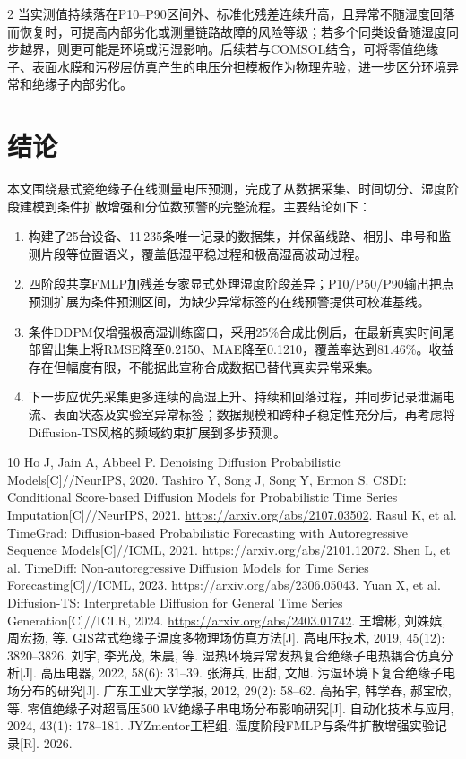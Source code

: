 \documentclass[UTF8,a4paper,10pt]{ctexart}
\begin{document}
\begin{multicols}{2}
当实测值持续落在P10--P90区间外、标准化残差连续升高，且异常不随湿度回落而恢复时，可提高内部劣化或测量链路故障的风险等级；若多个同类设备随湿度同步越界，则更可能是环境或污湿影响。后续若与COMSOL结合，可将零值绝缘子、表面水膜和污秽层仿真产生的电压分担模板作为物理先验，进一步区分环境异常和绝缘子内部劣化。

\section{结论}
本文围绕悬式瓷绝缘子在线测量电压预测，完成了从数据采集、时间切分、湿度阶段建模到条件扩散增强和分位数预警的完整流程。主要结论如下：
\begin{enumerate}[leftmargin=1.4em,itemsep=0.1em]
\item 构建了25台设备、11\,235条唯一记录的数据集，并保留线路、相别、串号和监测片段等位置语义，覆盖低湿平稳过程和极高湿高波动过程。
\item 四阶段共享FMLP加残差专家显式处理湿度阶段差异；P10/P50/P90输出把点预测扩展为条件预测区间，为缺少异常标签的在线预警提供可校准基线。
\item 条件DDPM仅增强极高湿训练窗口，采用25\%合成比例后，在最新真实时间尾部留出集上将RMSE降至0.2150、MAE降至0.1210，覆盖率达到81.46\%。收益存在但幅度有限，不能据此宣称合成数据已替代真实异常采集。
\item 下一步应优先采集更多连续的高湿上升、持续和回落过程，并同步记录泄漏电流、表面状态及实验室异常标签；数据规模和跨种子稳定性充分后，再考虑将Diffusion-TS风格的频域约束扩展到多步预测。
\end{enumerate}

\begin{thebibliography}{10}
 Ho J, Jain A, Abbeel P. Denoising Diffusion Probabilistic Models[C]//NeurIPS, 2020.
 Tashiro Y, Song J, Song Y, Ermon S. CSDI: Conditional Score-based Diffusion Models for Probabilistic Time Series Imputation[C]//NeurIPS, 2021. \url{https://arxiv.org/abs/2107.03502}.
 Rasul K, et al. TimeGrad: Diffusion-based Probabilistic Forecasting with Autoregressive Sequence Models[C]//ICML, 2021. \url{https://arxiv.org/abs/2101.12072}.
 Shen L, et al. TimeDiff: Non-autoregressive Diffusion Models for Time Series Forecasting[C]//ICML, 2023. \url{https://arxiv.org/abs/2306.05043}.
 Yuan X, et al. Diffusion-TS: Interpretable Diffusion for General Time Series Generation[C]//ICLR, 2024. \url{https://arxiv.org/abs/2403.01742}.
 王增彬, 刘姝嫔, 周宏扬, 等. GIS盆式绝缘子温度多物理场仿真方法[J]. 高电压技术, 2019, 45(12): 3820--3826.
 刘宇, 李光茂, 朱晨, 等. 湿热环境异常发热复合绝缘子电热耦合仿真分析[J]. 高压电器, 2022, 58(6): 31--39.
 张海兵, 田甜, 文旭. 污湿环境下复合绝缘子电场分布的研究[J]. 广东工业大学学报, 2012, 29(2): 58--62.
 高拓宇, 韩学春, 郝宝欣, 等. 零值绝缘子对超高压500 kV绝缘子串电场分布影响研究[J]. 自动化技术与应用, 2024, 43(1): 178--181.
 JYZmentor工程组. 湿度阶段FMLP与条件扩散增强实验记录[R]. 2026.
\end{thebibliography}
\end{multicols}
\end{document}
